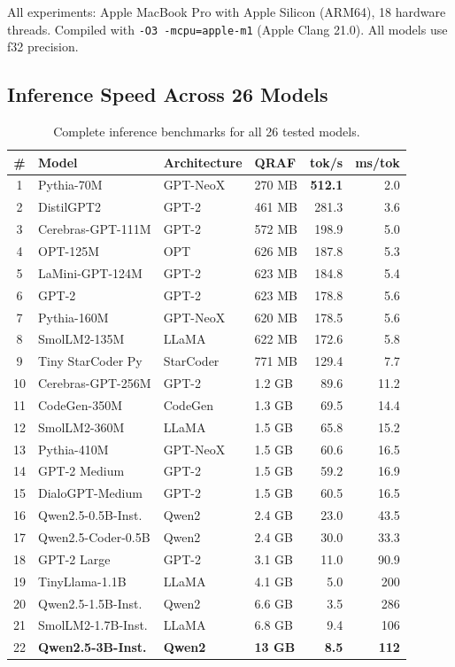 \documentclass[12pt,a4paper]{article}
\begin{document}
All experiments: Apple MacBook Pro with Apple Silicon (ARM64), 18 hardware threads. Compiled with \texttt{-O3 -mcpu=apple-m1} (Apple Clang 21.0). All models use f32 precision.

\subsection{Inference Speed Across 26 Models}

\begin{table}[H]
\centering
\caption{Complete inference benchmarks for all 26 tested models.}
\label{tab:full_benchmark}
\begin{tabular}{@{}clllrr@{}}
\toprule
\textbf{\#} & \textbf{Model} & \textbf{Architecture} & \textbf{QRAF} & \textbf{tok/s} & \textbf{ms/tok} \\
\midrule
1 & Pythia-70M & GPT-NeoX & 270 MB & \textbf{512.1} & 2.0 \\
2 & DistilGPT2 & GPT-2 & 461 MB & 281.3 & 3.6 \\
3 & Cerebras-GPT-111M & GPT-2 & 572 MB & 198.9 & 5.0 \\
4 & OPT-125M & OPT & 626 MB & 187.8 & 5.3 \\
5 & LaMini-GPT-124M & GPT-2 & 623 MB & 184.8 & 5.4 \\
6 & GPT-2 & GPT-2 & 623 MB & 178.8 & 5.6 \\
7 & Pythia-160M & GPT-NeoX & 620 MB & 178.5 & 5.6 \\
8 & SmolLM2-135M & LLaMA & 622 MB & 172.6 & 5.8 \\
9 & Tiny StarCoder Py & StarCoder & 771 MB & 129.4 & 7.7 \\
10 & Cerebras-GPT-256M & GPT-2 & 1.2 GB & 89.6 & 11.2 \\
11 & CodeGen-350M & CodeGen & 1.3 GB & 69.5 & 14.4 \\
12 & SmolLM2-360M & LLaMA & 1.5 GB & 65.8 & 15.2 \\
13 & Pythia-410M & GPT-NeoX & 1.5 GB & 60.6 & 16.5 \\
14 & GPT-2 Medium & GPT-2 & 1.5 GB & 59.2 & 16.9 \\
15 & DialoGPT-Medium & GPT-2 & 1.5 GB & 60.5 & 16.5 \\
16 & Qwen2.5-0.5B-Inst. & Qwen2 & 2.4 GB & 23.0 & 43.5 \\
17 & Qwen2.5-Coder-0.5B & Qwen2 & 2.4 GB & 30.0 & 33.3 \\
18 & GPT-2 Large & GPT-2 & 3.1 GB & 11.0 & 90.9 \\
19 & TinyLlama-1.1B & LLaMA & 4.1 GB & 5.0 & 200 \\
20 & Qwen2.5-1.5B-Inst. & Qwen2 & 6.6 GB & 3.5 & 286 \\
21 & SmolLM2-1.7B-Inst. & LLaMA & 6.8 GB & 9.4 & 106 \\
22 & \textbf{Qwen2.5-3B-Inst.} & \textbf{Qwen2} & \textbf{13 GB} & \textbf{8.5} & \textbf{112} \\
\bottomrule
\end{tabular}
\end{table}
\end{document}

